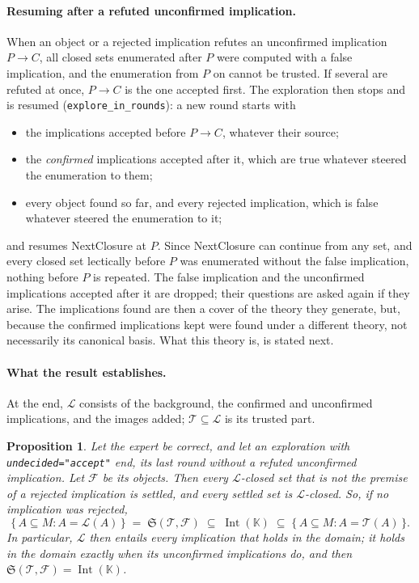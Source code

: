 \documentclass[11pt,a4paper]{article}
\newtheorem{proposition}{Proposition}
\theoremstyle{definition}
\theoremstyle{remark}
\newcommand{\code}[1]{\texttt{#1}}
\newcommand{\cl}{\mathcal{L}}
\newcommand{\Int}{\operatorname{Int}}
\begin{document}
\paragraph{Resuming after a refuted unconfirmed implication.}\label{sec:rounds}
When an object or a rejected implication refutes an unconfirmed implication $P \to C$, all closed sets enumerated after $P$ were computed with a false implication, and the enumeration from $P$ on cannot be trusted. If several are refuted at once, $P \to C$ is the one accepted first. The exploration then stops and is resumed (\code{explore\_in\_rounds}): a new round starts with
\begin{itemize}
  \item the implications accepted before $P \to C$, whatever their source;
  \item the \emph{confirmed} implications accepted after it, which are true whatever steered the enumeration to them;
  \item every object found so far, and every rejected implication, which is false whatever steered the enumeration to it;
\end{itemize}
and resumes NextClosure at $P$. Since NextClosure can continue from any set, and every closed set lectically before $P$ was enumerated without the false implication, nothing before $P$ is repeated. The false implication and the unconfirmed implications accepted after it are dropped; their questions are asked again if they arise. The implications found are then a cover of the theory they generate, but, because the confirmed implications kept were found under a different theory, not necessarily its canonical basis. What this theory is, is stated next.

\paragraph{What the result establishes.}
At the end, $\cl$ consists of the background, the confirmed and unconfirmed implications, and the images added; $\mathcal{T} \subseteq \cl$ is its trusted part.

\begin{proposition}\label{prop:accept}
Let the expert be correct, and let an exploration with \code{undecided="accept"} end, its last round without a refuted unconfirmed implication. Let $\mathcal{F}$ be its objects. Then every $\cl$-closed set that is not the premise of a rejected implication is settled, and every settled set is $\cl$-closed. So, if no implication was rejected,
\[
  \{\, A \subseteq M : A = \cl(A) \,\} \;=\; \mathfrak{S}(\mathcal{T}, \mathcal{F}) \;\subseteq\; \Int(\mathbb{K}) \;\subseteq\; \{\, A \subseteq M : A = \mathcal{T}(A) \,\}.
\]
In particular, $\cl$ then entails every implication that holds in the domain; it holds in the domain exactly when its unconfirmed implications do, and then $\mathfrak{S}(\mathcal{T}, \mathcal{F}) = \Int(\mathbb{K})$.
\end{proposition}
\end{document}
